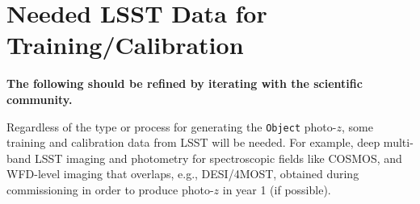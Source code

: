 \documentclass[DM,lsstdraft,toc]{lsstdoc}
\begin{document}




\section{Needed LSST Data for Training/Calibration}\label{sec:calib}

{\bf The following should be refined by iterating with the scientific community.}

Regardless of the type or process for generating the {\tt Object} photo-$z$, some training and calibration data from LSST will be needed.
For example, deep multi-band LSST imaging and photometry for spectroscopic fields like COSMOS, and WFD-level imaging that overlaps, e.g., DESI/4MOST, obtained during commissioning in order to produce photo-$z$ in year 1 (if possible).
\end{document}
